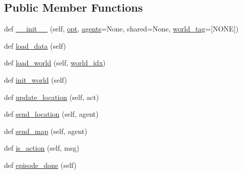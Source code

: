 \subsection*{Public Member Functions}
\begin{DoxyCompactItemize}
\item 
def \hyperlink{classparlai_1_1mturk_1_1tasks_1_1talkthewalk_1_1worlds_1_1TalkTheWalkWorld_a2bf246c349a56c3dc43e1caff2241c3b}{\+\_\+\+\_\+init\+\_\+\+\_\+} (self, \hyperlink{classparlai_1_1core_1_1worlds_1_1World_a3640d92718acd3e6942a28c1ab3678bd}{opt}, \hyperlink{classparlai_1_1core_1_1worlds_1_1MultiAgentDialogWorld_a05fc93525cb86edef121980fc55f9926}{agents}=None, shared=None, \hyperlink{classparlai_1_1mturk_1_1tasks_1_1talkthewalk_1_1worlds_1_1TalkTheWalkWorld_a0531d81b112ac673ed497218282687c8}{world\+\_\+tag}=\textquotesingle{}\mbox{[}N\+O\+NE\mbox{]}\textquotesingle{})
\item 
def \hyperlink{classparlai_1_1mturk_1_1tasks_1_1talkthewalk_1_1worlds_1_1TalkTheWalkWorld_a97f6a127548df0b16c669ea71b981c16}{load\+\_\+data} (self)
\item 
def \hyperlink{classparlai_1_1mturk_1_1tasks_1_1talkthewalk_1_1worlds_1_1TalkTheWalkWorld_aed8d5a0a3e3457f2334b33726912586c}{load\+\_\+world} (self, \hyperlink{classparlai_1_1mturk_1_1tasks_1_1talkthewalk_1_1worlds_1_1TalkTheWalkWorld_accdd40d13555e0b8a176d231516787e7}{world\+\_\+idx})
\item 
def \hyperlink{classparlai_1_1mturk_1_1tasks_1_1talkthewalk_1_1worlds_1_1TalkTheWalkWorld_a7a4766cb7ac6f67586387a87c5c3023b}{init\+\_\+world} (self)
\item 
def \hyperlink{classparlai_1_1mturk_1_1tasks_1_1talkthewalk_1_1worlds_1_1TalkTheWalkWorld_a30adb3fe817fef8f40a6a2f61773972d}{update\+\_\+location} (self, act)
\item 
def \hyperlink{classparlai_1_1mturk_1_1tasks_1_1talkthewalk_1_1worlds_1_1TalkTheWalkWorld_a0585864180ed00a891a8a2fc549ebfcf}{send\+\_\+location} (self, agent)
\item 
def \hyperlink{classparlai_1_1mturk_1_1tasks_1_1talkthewalk_1_1worlds_1_1TalkTheWalkWorld_a60b3eed2e7c28c3339498c83ebb7d269}{send\+\_\+map} (self, agent)
\item 
def \hyperlink{classparlai_1_1mturk_1_1tasks_1_1talkthewalk_1_1worlds_1_1TalkTheWalkWorld_a39aaaabf0760ced0c5d73f80ce196521}{is\+\_\+action} (self, msg)
\item 
def \hyperlink{classparlai_1_1mturk_1_1tasks_1_1talkthewalk_1_1worlds_1_1TalkTheWalkWorld_aa1470711aa1a8346a69f5eb0aa774590}{episode\+\_\+done} (self)

\end{DoxyCompactItemize}
